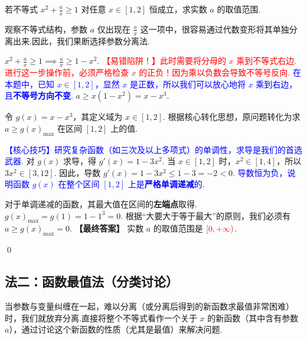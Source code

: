 \begin{exercise}
	若不等式 $x^2 + \frac{a}{x} \ge 1$ 对任意 $x \in [1, 2]$ 恒成立，求实数 $a$ 的取值范围.
\end{exercise}
\begin{solution}
	\textcolor{green!50!black}{观察不等式结构，参数 $a$ 仅出现在 $\frac{a}{x}$ 这一项中，很容易通过代数变形将其单独分离出来.因此，我们果断选择参数分离法.}

		$x^2 + \frac{a}{x} \ge 1 \implies \frac{a}{x} \ge 1 - x^2$.
		\textcolor{red}{【易错陷阱！】此时需要将分母的 $x$ 乘到不等式右边.进行这一步操作前，必须严格检查 $x$ 的正负！因为乘以负数会导致不等号反向.}
		\textcolor{blue}{在本题中，已知 $x \in [1, 2]$，显然 $x$ 是正数，所以我们可以放心地将 $x$ 乘到右边，且\textbf{不等号方向不变}.}
		$a \ge x(1-x^2) = x - x^3$.

		令 $g(x) = x - x^3$，其定义域为 $x \in [1, 2]$.
		根据核心转化思想，原问题转化为求 $a \ge g(x)_{\max}$ 在区间 $[1, 2]$ 上的值.
		
		\textcolor{blue}{【核心技巧】研究复杂函数（如三次及以上多项式）的单调性，求导是我们的首选武器.}
		对 $g(x)$ 求导，得 $g'(x) = 1 - 3x^2$.
		当 $x \in [1, 2]$ 时，$x^2 \in [1, 4]$，所以 $3x^2 \in [3, 12]$.
		因此，导数 $g'(x) = 1 - 3x^2 \le 1 - 3 = -2 < 0$.
		\textcolor{blue}{导数恒为负，说明函数 $g(x)$ 在整个区间 $[1, 2]$ 上是\textbf{严格单调递减}的.}

		对于单调递减的函数，其最大值在区间的\textbf{左端点}取得.
		$g(x)_{\max} = g(1) = 1 - 1^3 = 0$.
		根据“大要大于等于最大”的原则，我们必须有 $a \ge g(x)_{\max} = 0$.
	\textbf{【最终答案】} 实数 $a$ 的取值范围是 $\textcolor{red}{[0, +\infty)}$.
\end{solution}
\qed

\subsection{法二：函数最值法（分类讨论）}

\begin{definition}[函数最值法]
	当参数与变量纠缠在一起，难以分离（或分离后得到的新函数求最值非常困难）时，我们就放弃分离.直接将整个不等式看作一个关于 $x$ 的新函数（其中含有参数 $a$），通过讨论这个新函数的性质（尤其是最值）来解决问题.
\end{definition}

